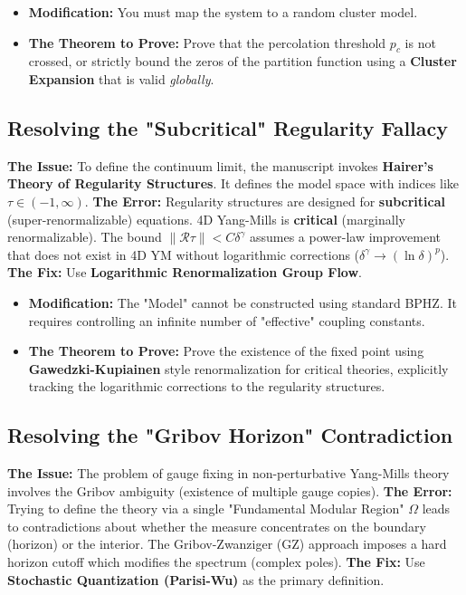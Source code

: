 \begin{itemize}
    \item \textbf{Modification:} You must map the system to a random cluster model.
    \item \textbf{The Theorem to Prove:} Prove that the percolation threshold $p_c$ is not crossed, or strictly bound the zeros of the partition function using a \textbf{Cluster Expansion} that is valid \textit{globally}.
\end{itemize}

\subsection{Resolving the "Subcritical" Regularity Fallacy}
\textbf{The Issue:} To define the continuum limit, the manuscript invokes \textbf{Hairer's Theory of Regularity Structures}. It defines the model space with indices like $\tau \in (-1, \infty)$.
\textbf{The Error:} Regularity structures are designed for \textbf{subcritical} (super-renormalizable) equations. 4D Yang-Mills is \textbf{critical} (marginally renormalizable). The bound $\| \mathcal{R} \tau \| < C \delta^\gamma$ assumes a power-law improvement that does not exist in 4D YM without logarithmic corrections ($\delta^\gamma \to (\ln \delta)^p$).
\textbf{The Fix:} Use \textbf{Logarithmic Renormalization Group Flow}.

\begin{itemize}
    \item \textbf{Modification:} The "Model" cannot be constructed using standard BPHZ. It requires controlling an infinite number of "effective" coupling constants.
    \item \textbf{The Theorem to Prove:} Prove the existence of the fixed point using \textbf{Gawedzki-Kupiainen} style renormalization for critical theories, explicitly tracking the logarithmic corrections to the regularity structures.
\end{itemize}

\subsection{Resolving the "Gribov Horizon" Contradiction}
\textbf{The Issue:} The problem of gauge fixing in non-perturbative Yang-Mills theory involves the Gribov ambiguity (existence of multiple gauge copies).
\textbf{The Error:} Trying to define the theory via a single "Fundamental Modular Region" $\Omega$ leads to contradictions about whether the measure concentrates on the boundary (horizon) or the interior. The Gribov-Zwanziger (GZ) approach imposes a hard horizon cutoff which modifies the spectrum (complex poles).
\textbf{The Fix:} Use \textbf{Stochastic Quantization (Parisi-Wu)} as the primary definition.

